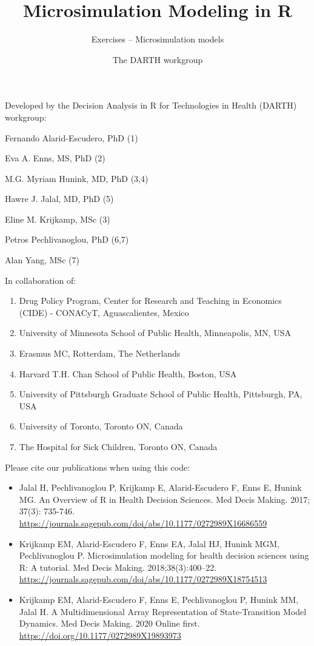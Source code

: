 \documentclass[
]{article}
\title{Microsimulation Modeling in R}
\subtitle{Exercises -- Microsimulation models}
\author{The DARTH workgroup}
\date{}
\providecommand{\tightlist}{%
  \setlength{\itemsep}{0pt}\setlength{\parskip}{0pt}}
\begin{document}
\maketitle

Developed by the Decision Analysis in R for Technologies in Health
(DARTH) workgroup:

Fernando Alarid-Escudero, PhD (1)

Eva A. Enns, MS, PhD (2)

M.G. Myriam Hunink, MD, PhD (3,4)

Hawre J. Jalal, MD, PhD (5)

Eline M. Krijkamp, MSc (3)

Petros Pechlivanoglou, PhD (6,7)

Alan Yang, MSc (7)

In collaboration of:

\begin{enumerate}
\def\labelenumi{\arabic{enumi}.}
\tightlist
\item
  Drug Policy Program, Center for Research and Teaching in Economics
  (CIDE) - CONACyT, Aguascalientes, Mexico
\item
  University of Minnesota School of Public Health, Minneapolis, MN, USA
\item
  Erasmus MC, Rotterdam, The Netherlands
\item
  Harvard T.H. Chan School of Public Health, Boston, USA
\item
  University of Pittsburgh Graduate School of Public Health, Pittsburgh,
  PA, USA
\item
  University of Toronto, Toronto ON, Canada
\item
  The Hospital for Sick Children, Toronto ON, Canada
\end{enumerate}

Please cite our publications when using this code:

\begin{itemize}
\item
  Jalal H, Pechlivanoglou P, Krijkamp E, Alarid-Escudero F, Enns E,
  Hunink MG. An Overview of R in Health Decision Sciences. Med Decis
  Making. 2017; 37(3): 735-746.
  \url{https://journals.sagepub.com/doi/abs/10.1177/0272989X16686559}
\item
  Krijkamp EM, Alarid-Escudero F, Enns EA, Jalal HJ, Hunink MGM,
  Pechlivanoglou P. Microsimulation modeling for health decision
  sciences using R: A tutorial. Med Decis Making. 2018;38(3):400--22.
  \url{https://journals.sagepub.com/doi/abs/10.1177/0272989X18754513}
\item
  Krijkamp EM, Alarid-Escudero F, Enns E, Pechlivanoglou P, Hunink MM,
  Jalal H. A Multidimensional Array Representation of State-Transition
  Model Dynamics. Med Decis Making. 2020 Online first.
  \url{https://doi.org/10.1177/0272989X19893973}
\end{itemize}
\end{document}
